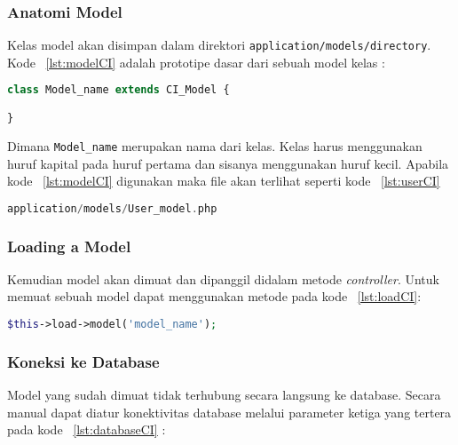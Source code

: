 \subsubsection{Anatomi Model}
\label{ss:anatomiModelCI}
Kelas model akan disimpan dalam direktori \texttt{application/models/directory}. Kode ~\ref{lst:modelCI} adalah prototipe dasar dari sebuah model kelas :

\begin{lstlisting}[style=customphp, language=PHP, basicstyle=\ttfamily, frame=single, columns=fullflexible, keepspaces=true, breaklines=true, showstringspaces=false, label={lst:modelCI}, caption=Struktur model pada codeIgniter.]  
class Model_name extends CI_Model {

}
\end{lstlisting}

Dimana \texttt{Model\_name} merupakan nama dari kelas. Kelas harus menggunakan huruf kapital pada huruf pertama dan sisanya menggunakan huruf kecil. Apabila kode ~\ref{lst:modelCI} digunakan maka file akan terlihat seperti kode ~\ref{lst:userCI}
\begin{lstlisting}[style=customphp, language=PHP, basicstyle=\ttfamily, frame=single, columns=fullflexible, keepspaces=true, breaklines=true, showstringspaces=false, label={lst:userCI}, caption=Contoh model codeIgniter.]  
application/models/User_model.php
\end{lstlisting}

\subsubsection{Loading a Model}
\label{ss:loadModelCI}
Kemudian model akan dimuat dan dipanggil didalam metode \textit{controller}. Untuk memuat sebuah model dapat menggunakan metode pada kode ~\ref{lst:loadCI}:

\begin{lstlisting}[style=customphp, language=PHP, basicstyle=\ttfamily, frame=single, columns=fullflexible, keepspaces=true, breaklines=true, showstringspaces=false, label={lst:loadCI}, caption=Contoh pemanggilan model pada codeIgniter.] 
$this->load->model('model_name');
\end{lstlisting}

\subsubsection{Koneksi ke Database}
\label{ss:databaseModelCI}
Model yang sudah dimuat tidak terhubung secara langsung ke database. Secara manual dapat diatur konektivitas database melalui parameter ketiga yang tertera pada kode ~\ref{lst:databaseCI} :

